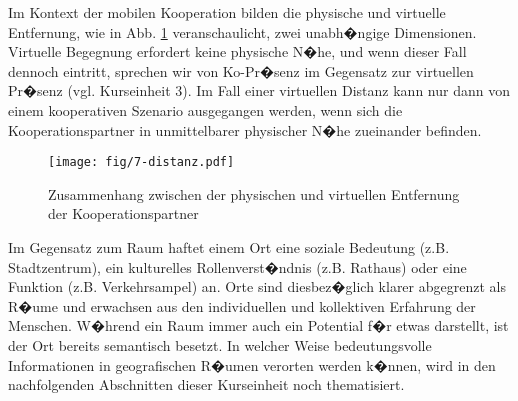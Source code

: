 Im Kontext der mobilen Kooperation bilden die physische und virtuelle Entfernung, wie in Abb. \ref{7Entfernung} veranschaulicht, zwei unabh�ngige Dimensionen. Virtuelle Begegnung erfordert keine physische N�he, und wenn dieser Fall dennoch eintritt, sprechen wir von Ko-Pr�senz im Gegensatz zur virtuellen Pr�senz (vgl. Kurseinheit 3). Im Fall einer virtuellen Distanz kann nur dann von einem kooperativen Szenario ausgegangen werden, wenn sich die Kooperationspartner in unmittelbarer physischer N�he zueinander befinden. 

\begin{figure}
  \texttt{[image: fig/7-distanz.pdf]}\\
  \caption{Zusammenhang zwischen der physischen und virtuellen Entfernung der Kooperationspartner}
\label{7Entfernung}
\end{figure}

Im Gegensatz zum Raum haftet einem Ort eine soziale Bedeutung (z.B. Stadtzentrum), ein kulturelles Rollenverst�ndnis (z.B. Rathaus) oder eine Funktion (z.B. Verkehrsampel) an. Orte sind diesbez�glich klarer abgegrenzt als R�ume und erwachsen aus den individuellen und kollektiven Erfahrung der Menschen. W�hrend ein Raum immer auch ein Potential f�r etwas darstellt, ist der Ort bereits semantisch besetzt. In welcher Weise bedeutungsvolle Informationen in geografischen R�umen verorten werden k�nnen, wird in den nachfolgenden Abschnitten dieser Kurseinheit noch thematisiert. 




